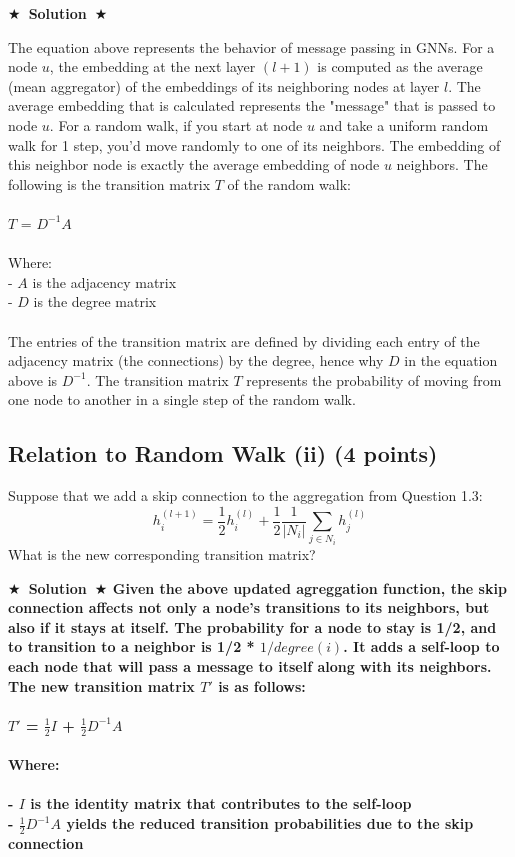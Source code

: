 \documentclass{article}
\numberwithin{figure}{section}
\newcommand{\Solution}[1]{{\medskip \color{red} \bf $\bigstar$~\sf \textbf{Solution}~$\bigstar$ \sf #1 } \bigskip}
\begin{document}
\Solution{

The equation above represents the behavior of message passing in GNNs. For a node $u$, the embedding at the next layer $(l + 1)$ is computed as the average (mean aggregator) of the embeddings of its neighboring nodes at layer $l$. The average embedding that is calculated represents the "message" that is passed to node $u$. For a random walk, if you start at node $u$ and take a uniform random walk for 1 step, you'd move randomly to one of its neighbors. The embedding of this neighbor node is exactly the average embedding of node $u$ neighbors. The following is the transition matrix $T$ of the random walk:
\\
\\
$T$ = $D^{-1}$$A$
\\
\\
Where:
\\
- $A$ is the adjacency matrix
\\
- $D$ is the degree matrix
\\
\\
The entries of the transition matrix are defined by dividing each entry of the adjacency matrix (the connections) by the degree, hence why $D$ in the equation above is $D^{-1}$. The transition matrix $T$ represents the probability of moving from one node to another in a single step of the random walk.

}


\subsection{Relation to Random Walk (ii) (4 points)}

Suppose that we add a skip connection to the aggregation from Question 1.3:
$$h^{(l+1)}_i = \frac{1}{2}h^{(l)}_i + \frac{1}{2}\frac{1}{|N_i|} \sum_{j \in N_i} h^{(l)}_j$$
What is the new corresponding transition matrix?

\Solution{
Given the above updated agreggation function,  the skip connection affects not only a node's transitions to its neighbors, but also if it stays at itself. The probability for a node to stay is 1/2, and to transition to a neighbor is 1/2 * $1/degree(i)$. It adds a self-loop to each node that will pass a message to itself along with its neighbors. The new transition matrix $T{'}$ is as follows:
\\
\\
$T{'}$ = $\frac{1}{2}$$I$ + $\frac{1}{2}$$D^{-1}$$A$
\\
\\
Where:\\\\
- $I$ is the identity matrix that contributes to the self-loop\\
- $\frac{1}{2}$$D^{-1}$$A$ yields the reduced transition probabilities due to the skip connection

}
\end{document}
